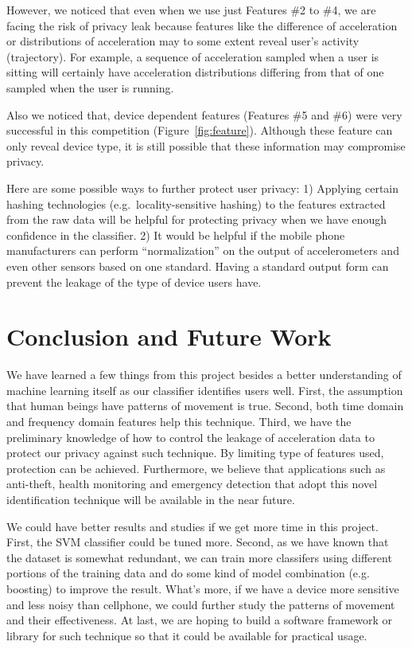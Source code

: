 \documentclass{article} %
\begin{document}
However, we noticed that even when we use just Features \#2 to \#4, we are facing the risk of privacy leak because features like the difference of acceleration or distributions of acceleration may to some extent reveal user's activity (trajectory). For example, a sequence of acceleration sampled when a user is sitting will certainly have acceleration distributions differing from that of one sampled when the user is running.

Also we noticed that, device dependent features (Features \#5 and \#6) were very successful in this competition (Figure~\ref{fig:feature}). Although these feature can only reveal device type, it is still possible that these information may compromise privacy.

Here are some possible ways to further protect user privacy: 1) Applying certain hashing technologies (e.g.\ locality-sensitive hashing) to the features extracted from the raw data will be helpful for protecting privacy when we have enough confidence in the classifier. 2) It would be helpful if the mobile phone manufacturers can perform ``normalization'' on the output of accelerometers and even other sensors based on one standard. Having a standard output form can prevent the leakage of the type of device users have.

\section{Conclusion and Future Work}


We have learned a few things from this project besides a better understanding of machine learning itself as our classifier identifies users well. First, the assumption that human beings have patterns of movement is true. Second, both time domain and frequency domain features help this technique. Third, we have the preliminary knowledge of how to control the leakage of acceleration data to protect our privacy against such technique. By limiting type of features used, protection can be achieved. Furthermore, we believe that applications such as anti-theft, health monitoring and emergency detection that adopt this novel identification technique will be available in the near future.

We could have better results and studies if we get more time in this project. First, the SVM classifier could be tuned more. Second, as we have known that the dataset is somewhat redundant, we can train more classifers using different portions of the training data and do some kind of model combination (e.g. boosting) to improve the result. What's more, if we have a device more sensitive and less noisy than cellphone, we could further study the patterns of movement and their effectiveness. At last, we are hoping to build a software framework or library for such technique so that it could be available for practical usage.




\end{document}
